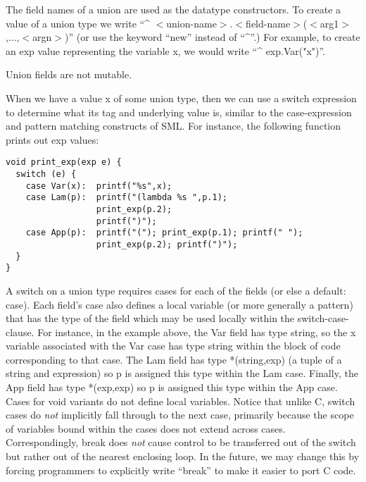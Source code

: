 \documentclass[titlepage,10pt]{article}
\begin{document}
The field names of a union are used as the datatype constructors.  To
create a value of a union type we write
``\^{} $<$union-name$>$.$<$field-name$>$($<$arg1$>$,...,$<$argn$>$)'' (or
use the keyword ``new'' instead of ``\^{}''.)  For example, to create an
exp value representing the variable x, we would write
``\^{} exp.Var("x")''.

Union fields are not mutable.

When we have a value x of some union type, then we can use a switch
expression to determine what its tag and underlying value is, similar to
the case-expression and pattern matching constructs of SML.  For
instance, the following function prints out exp values:


\begin{verbatim}
void print_exp(exp e) {
  switch (e) {
    case Var(x):  printf("%s",x);
    case Lam(p):  printf("(lambda %s ",p.1);
                  print_exp(p.2);
                  printf(")");
    case App(p):  printf("("); print_exp(p.1); printf(" ");
                  print_exp(p.2); printf(")");
  }
}
\end{verbatim}

A switch on a union type requires cases for each of the fields (or else
a default: case).  Each field's case also defines a local variable (or
more generally a pattern) that has the type of the field which may be
used locally within the switch-case-clause.  For instance, in the
example above, the Var field has type string, so the x variable
associated with the Var case has type string within the block of code
corresponding to that case.  The Lam field has type *(string,exp) (a
tuple of a string and expression) so p is assigned this type within the
Lam case.  Finally, the App field has type *(exp,exp) so p is assigned
this type within the App case.  Cases for void variants do not define
local variables.  Notice that unlike C, switch cases do \textit{not}
implicitly fall through to the next case, primarily because the scope of
variables bound within the cases does not extend across cases.
Correspondingly, break does \textit{not} cause control to be transferred
out of the switch but rather out of the nearest enclosing loop.  In the
future, we may change this by forcing programmers to explicitly write
``break'' to make it easier to port C code.
\end{document}
